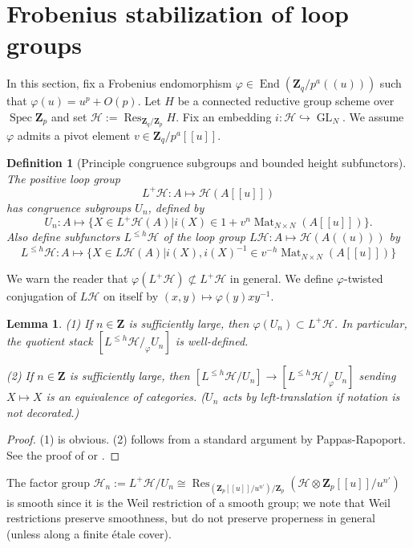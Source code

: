 \documentclass[11pt]{amsart}
\newtheorem{lem}{Lemma}
\newtheorem{dfn}{Definition}
\numberwithin{thm}{section}
\numberwithin{lem}{section}
\numberwithin{cor}{section}
\numberwithin{prop}{section}
\numberwithin{exam}{section}
\numberwithin{dfn}{section}
\newcommand{\End}{\operatorname{End}}
\newcommand{\Res}{\operatorname{Res}}
\newcommand{\GL}{\operatorname{GL}}
\newcommand{\spec}{\operatorname{Spec}}
\newcommand{\clH}{\mathcal{H}}
\newcommand{\Z}{\mathbf{Z}}
\begin{document}
\section{Frobenius stabilization of loop groups}

In this section,
fix a Frobenius endomorphism
$\varphi\in \End(\Z_q/p^a(\!(u)\!))$
such that $\varphi(u)=u^p+O(p)$.
Let $H$ be a connected reductive group scheme over $\spec \Z_p$
and set $\clH:=\Res_{\Z_q/\Z_p}H$.
Fix an embedding $i:\clH \hookrightarrow\GL_N$.
We assume $\varphi$ admits a pivot element $v
\in \Z_q/p^a[\![u]\!]$.

\begin{dfn}[Principle congruence subgroups
and bounded height subfunctors]
The positive loop group 
\[
L^+\clH: A\mapsto\clH(A[\![u]\!])
\] has
congruence subgroups $U_n$,
defined by
$$
U_n: A \mapsto \{X\in L^+\clH(A)| i(X) \in 1+ v^{n}\operatorname{Mat}_{N\times N}(A[\![u]\!]) \}.
$$
Also define
subfunctors $L^{\le h}\clH$ of the loop group
$L\clH:A\mapsto\clH(A(\!(u)\!))$
by
\[
L^{\le h}\clH: 
A\mapsto\{X\in L\clH(A)| i(X),i(X)^{-1}\in v^{-h}\operatorname{Mat}_{N\times N}(A[\![u]\!]) \}
\]
\end{dfn}

We warn the reader that $\varphi(L^+\clH)\not\subset L^+\clH$
in general.
We define $\varphi$-twisted conjugation of
$L\clH$ on itself
by $(x,y)\mapsto \varphi(y) x y^{-1}$.

\begin{lem}
(1)
If $n\in \Z$ is sufficiently large, then
$\varphi(U_n)\subset L^+\clH$.
In particular,
the quotient stack
$[L^{\le h}\clH/_\varphi U_n]$
is well-defined.

(2)
If $n\in \Z$ is sufficiently large, then
$
[L^{\le h}\clH/U_n] \to [L^{\le h}\clH/_\varphi U_n]
$
sending $X\mapsto X$
is an equivalence of categories.
($U_n$ acts by left-translation if notation is not decorated.)
\end{lem}

\begin{proof}
(1) is obvious.
(2) follows from a standard argument by Pappas-Rapoport.
See the proof of \cite[Prop. 2.2]{PR09} or \cite[Lemma 5.2.9]{EG23}.
\end{proof}

The factor group $\clH_n:= L^+\clH/U_n \cong
\Res_{(\Z_p[\![u]\!]/u^{n'})/\Z_p}(\clH\otimes 
\Z_p[\![u]\!]/u^{n'})$
is smooth since it is the Weil restriction of a smooth group;
we note that Weil restrictions
preserve smoothness, but do not preserve properness
in general
(unless along a finite \'etale cover).
\end{document}
